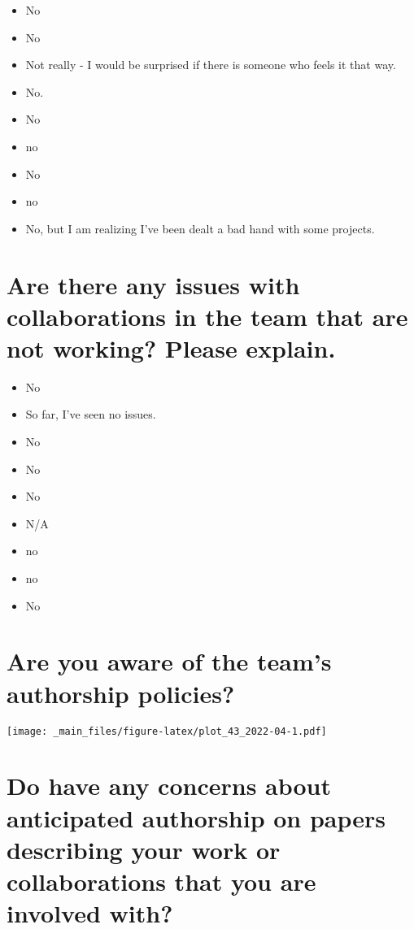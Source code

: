\documentclass[
]{book}
\providecommand{\tightlist}{%
  \setlength{\itemsep}{0pt}\setlength{\parskip}{0pt}}
\begin{document}
\begin{itemize}
\tightlist
\item
  No
\item
  No
\item
  Not really - I would be surprised if there is someone who feels it that way.
\item
  No.
\item
  No
\item
  no
\item
  No
\item
  no
\item
  No, but I am realizing I've been dealt a bad hand with some projects.
\end{itemize}

\hypertarget{are-there-any-issues-with-collaborations-in-the-team-that-are-not-working-please-explain.}{%
\section{Are there any issues with collaborations in the team that are not working? Please explain.}\label{are-there-any-issues-with-collaborations-in-the-team-that-are-not-working-please-explain.}}

\begin{itemize}
\tightlist
\item
  No
\item
  So far, I've seen no issues.
\item
  No
\item
  No
\item
  No
\item
  N/A
\item
  no
\item
  no
\item
  No
\end{itemize}

\hypertarget{are-you-aware-of-the-teams-authorship-policies}{%
\section{Are you aware of the team's authorship policies?}\label{are-you-aware-of-the-teams-authorship-policies}}

\texttt{[image: \_main\_files/figure-latex/plot\_43\_2022-04-1.pdf]}

\hypertarget{do-have-any-concerns-about-anticipated-authorship-on-papers-describing-your-work-or-collaborations-that-you-are-involved-with}{%
\section{Do have any concerns about anticipated authorship on papers describing your work or collaborations that you are involved with?}\label{do-have-any-concerns-about-anticipated-authorship-on-papers-describing-your-work-or-collaborations-that-you-are-involved-with}}
\end{document}

